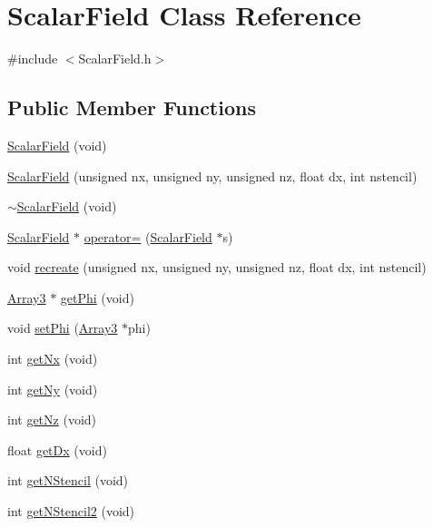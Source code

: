 \section{ScalarField Class Reference}
\label{classScalarField}


{\ttfamily \#include $<$ScalarField.h$>$}

\subsection*{Public Member Functions}
\begin{DoxyCompactItemize}
\item 
\hyperlink{classScalarField_a96be7ab68de0ac5b4b787a21ea0d1226}{ScalarField} (void)
\item 
\hyperlink{classScalarField_ac6fe0f415f8669a5c2f32bb20c4ffcdd}{ScalarField} (unsigned nx, unsigned ny, unsigned nz, float dx, int nstencil)
\item 
\hyperlink{classScalarField_a930ebe53ad6b9d5496d955ca57f6629f}{$\sim$ScalarField} (void)
\item 
\hyperlink{classScalarField}{ScalarField} $\ast$ \hyperlink{classScalarField_a318c134b9f29a00d923559389d837aba}{operator=} (\hyperlink{classScalarField}{ScalarField} $\ast$s)
\item 
void \hyperlink{classScalarField_a84c4451b7ba5dbdb57267ec575f8fa86}{recreate} (unsigned nx, unsigned ny, unsigned nz, float dx, int nstencil)
\item 
\hyperlink{classArray3}{Array3} $\ast$ \hyperlink{classScalarField_ad75a79c263b2a3eb2a9aa0962fde0e7e}{getPhi} (void)
\item 
void \hyperlink{classScalarField_af2cc37199c70deb64889b493b90a6d13}{setPhi} (\hyperlink{classArray3}{Array3} $\ast$phi)
\item 
int \hyperlink{classScalarField_abd73cd609870a92c3611e81acfb557e3}{getNx} (void)
\item 
int \hyperlink{classScalarField_a39ef61f0794402f2bb1dc2f9c7426968}{getNy} (void)
\item 
int \hyperlink{classScalarField_ade36f1afaae1779ee940510f495e54b7}{getNz} (void)
\item 
float \hyperlink{classScalarField_a7d89f720e1e73257d853a3f782b6c34b}{getDx} (void)
\item 
int \hyperlink{classScalarField_aab10b08ed6cfa14163c6faf1086acc24}{getNStencil} (void)
\item 
int \hyperlink{classScalarField_a77630e83e5e7e0bb67c6db08e32d7d39}{getNStencil2} (void)

\end{DoxyCompactItemize}
